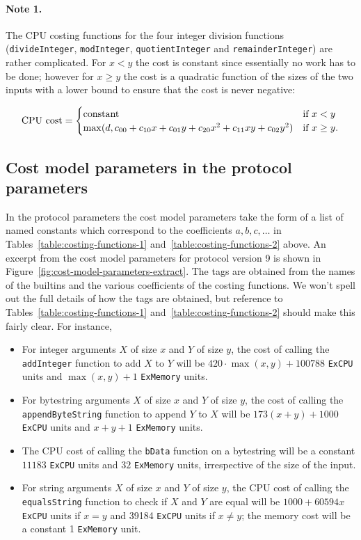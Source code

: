 \documentclass[a4paper]{article}
\begin{document}
\paragraph{Note 1.}
The CPU costing functions for the four integer division functions
(\verb|divideInteger|, \verb|modInteger|, \verb|quotientInteger| and
\verb|remainderInteger|) are rather complicated.  For $x<y$ the cost is constant
since essentially no work has to be done; however for $x \geq y$ the cost is a
quadratic function of the sizes of the two inputs with a lower bound to ensure
that the cost is never negative:

$$
\text{CPU cost} = \begin{cases}
  \text{constant} & \text{if $x<y$} \\
  \max(d, c_{00} + c_{10}x + c_{01}y + c_{20}x^2 + c_{11}xy + c_{02}y^2) & \text{if $x \geq y$}.
\end{cases}
$$

\subsection{Cost model parameters in the protocol parameters}
\label{sec:cost-model-parameters}
In the protocol parameters the cost model parameters take the form of a list of
named constants which correspond to the coefficients $a, b, c, \ldots$ in
Tables~\ref{table:costing-functions-1} and~\ref{table:costing-functions-2}
above.  An excerpt from the cost model parameters for protocol version 9 is
shown in Figure~\ref{fig:cost-model-parameters-extract}.  The tags are obtained
from the names of the builtins and the various coefficients of the costing
functions.  We won't spell out the full details of how the tags are obtained,
but reference to Tables~\ref{table:costing-functions-1}
and~\ref{table:costing-functions-2} should make this fairly clear.  For
instance,
\begin{itemize}
\item For integer arguments $X$ of size $x$ and $Y$ of size $y$, the cost of
  calling the \texttt{addInteger} function to add $X$ to $Y$ will be
  $420\cdot\max(x,y) + 100788$ \texttt{ExCPU} units and $\max(x,y)+1$
  \texttt{ExMemory} units.
\item For bytestring arguments $X$ of size $x$ and $Y$ of size $y$, the cost of
  calling the \texttt{appendByteString} function to append $Y$ to $X$ will be
  $173(x+y)+1000$ \texttt{ExCPU} units and $x+y+1$ \texttt{ExMemory} units.
\item The CPU cost of calling the \texttt{bData} function on a bytestring will
  be a constant $11183$ \texttt{ExCPU} units and $32$ \texttt{ExMemory} units,
  irrespective of the size of the input.
\item For string arguments $X$ of size $x$ and $Y$ of size $y$, the CPU cost of
  calling the \texttt{equalsString} function to check if $X$ and $Y$ are equal
  will be $1000 + 60594x$ \texttt{ExCPU} units if $x=y$ and 39184 \texttt{ExCPU}
  units if $x \neq y$; the memory cost will be a constant 1 \texttt{ExMemory}
  unit.
\end{itemize}
\end{document}
